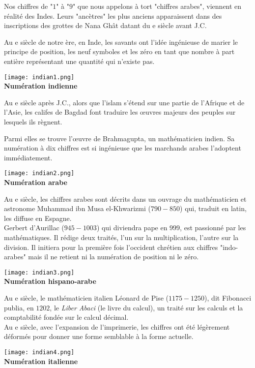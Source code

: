 \documentclass[a4paper,dvipsnames]{article}
\newcommand{\RNum}[1]{\uppercase\expandafter{\romannumeral #1\relax}}
\begin{document}
\begin{His}
Nos chiffres de "$1$" à "$9$" que nous appelons à tort "chiffres arabes", viennent en réalité des Indes. Leurs "ancètres" les plus anciens apparaissent dans des inscriptions des grottes de Nana Ghât datant du \RNum{2}e siècle avant J.C.

Au \RNum{5}e siècle de notre ère, en Inde, les savants ont l'idée ingénieuse de marier le principe de position, les neuf symboles et les zéro en tant que nombre à part entière représentant une quantité qui n'existe pas.

\begin{center}
\texttt{[image: indian1.png]}\\
\textbf{Numération indienne}
\end{center}

Au \RNum{8}e siècle après J.C., alors que l'islam s'étend sur une partie de l'Afrique et de l'Asie, les califes de Bagdad font traduire les œuvres majeurs des peuples sur lesquels ils règnent.

Parmi elles se trouve l'œuvre de Brahmagupta, un mathématicien indien. Sa numération à dix chiffres est si ingénieuse que les marchands arabes l'adoptent immédiatement.

\begin{center}
\texttt{[image: indian2.png]}\\
\textbf{Numération arabe}
\end{center}

Au \RNum{9}e siècle, les chiffres arabes sont décrits dans un ouvrage du mathématicien et astronome Muhammad ibn Musa el-Khwarizmi ($790-850$) qui, traduit en latin, les diffuse en Espagne.\\

Gerbert d'Aurillac ($945-1003$) qui diviendra pape en $999$, est passionné par les mathématiques. Il rédige deux traités, l'un sur la multiplication, l'autre sur la division. Il initiera pour la première fois l'occident chrétien aux chiffres "indo-arabes" mais il ne retient ni la numération de position ni le zéro. 

\begin{center}
\texttt{[image: indian3.png]}\\
\textbf{Numération hispano-arabe}
\end{center}

Au \RNum{13}e siècle, le mathématicien italien Léonard de Pise ($1175-1250$), dit Fibonacci publia, en $1202$, le \textit{Liber Abaci} (le livre du calcul), un traité sur les calculs et la comptabilité fondée sur le calcul décimal.\\

Au \RNum{15}e siècle, avec l'expansion de l'imprimerie, les chiffres ont été légèrement déformés pour donner une forme semblable à la forme actuelle. 

\begin{center}
\texttt{[image: indian4.png]}\\
\textbf{Numération italienne}
\end{center}
\end{His}
\end{document}
